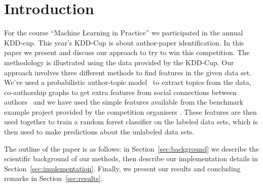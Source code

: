 \section{Introduction}

For the course ``Machine Learning in Practice'' we participated in the annual KDD-cup.
This year's KDD-Cup is about author-paper identification.
In this paper we present and discuss our approach to try to win this competition.
The methodology is illustrated using the data provided by the KDD-Cup.
Our approach involves three different methods to find features in the given data set.
We've used a probabilistic author-topic model~\cite{steyvers2004probabilistic} to extract topics from  the data, co-authorship graphs to get extra features from social connections between authors~\cite{liu2005co} and we have used the simple features available from the benchmark example project provided by the competition organisers \cite{kddcupsite}.
These features are then used together to train a random forest classifier on the labeled data sets, which is then used to make predictions about the unlabeled data sets.

The outline of the paper is as follows: in Section~\ref{sec:background} we describe the scientific background of our methods, then describe our implementation details in Section~\ref{sec:implementation}. Finally, we present our results and concluding remarks in Section~\ref{sec:results}.
